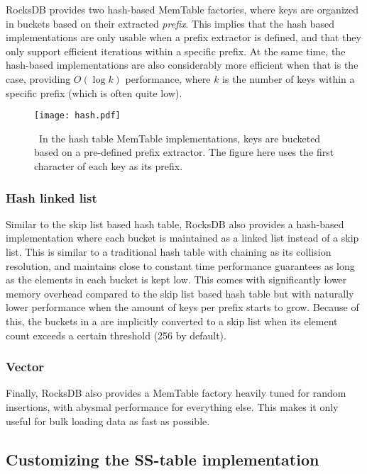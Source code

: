 RocksDB provides two hash-based MemTable factories, where keys are organized in
buckets based on their extracted \textit{prefix}. This implies that the hash
based implementations are only usable when a prefix extractor is defined, and
that they only support efficient iterations within a specific prefix. At the
same time, the hash-based implementations are also considerably more efficient
when that is the case, providing $ O(\log k) $ performance, where $ k $ is the
number of keys within a specific prefix (which is often quite low).

\begin{figure}[H]
  \centering
  \texttt{[image: hash.pdf]}
  \caption{\
    In the hash table MemTable implementations, keys are bucketed based on a
    pre-defined prefix extractor. The figure here uses the first character of
    each key as its prefix.
  }\label{fig:hash}
\end{figure}

\subsubsection{Hash linked list}

Similar to the skip list based hash table, RocksDB also provides a hash-based
implementation where each bucket is maintained as a linked list instead of a
skip list. This is similar to a traditional hash table with chaining as its
collision resolution, and maintains close to constant time performance
guarantees as long as the elements in each bucket is kept low. This comes with
significantly lower memory overhead compared to the skip list based hash table
but with naturally lower performance when the amount of keys per prefix starts
to grow. Because of this, the buckets in a \code{HashLinkList} are implicitly
converted to a skip list when its element count exceeds a certain threshold (256
by default).

\subsubsection{Vector}

Finally, RocksDB also provides a MemTable factory heavily tuned for random
insertions, with abysmal performance for everything else. This makes it only
useful for bulk loading data as fast as possible.

\subsection{Customizing the SS-table implementation}\label{sec:ss-table}

